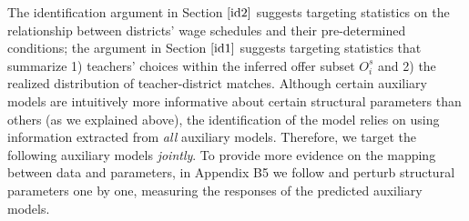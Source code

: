 \documentclass[notitlepage,12pt]{article}%
\begin{document}
The identification argument in Section $\ref{id2}$ suggests targeting
statistics on the relationship between districts' wage schedules and their
pre-determined conditions; the argument in Section $\ref{id1}$ suggests
targeting statistics that summarize 1) teachers' choices within the inferred
offer subset $O_{i}^{s}$ and 2) the realized distribution of teacher-district
matches. Although certain auxiliary models are intuitively more informative
about certain structural parameters than others (as we explained above), the
identification of the model relies on using information extracted from
\emph{all} auxiliary models. Therefore, we target the following auxiliary
models\emph{ jointly}. To provide more evidence on the mapping between data
and parameters, in Appendix B5 we follow \citet{einav2018provider} and
perturb structural parameters one by one, measuring the responses of the
predicted auxiliary models.
\end{document}
